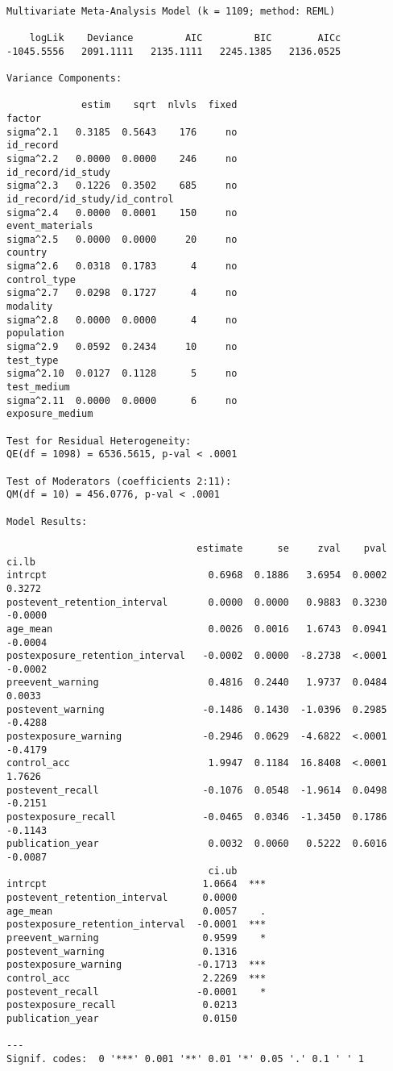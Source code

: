 \documentclass[
  letterpaper,
  DIV=11,
  numbers=noendperiod]{scrartcl}
\begin{document}
\begin{verbatim}

Multivariate Meta-Analysis Model (k = 1109; method: REML)

    logLik    Deviance         AIC         BIC        AICc   
-1045.5556   2091.1111   2135.1111   2245.1385   2136.0525   

Variance Components:

             estim    sqrt  nlvls  fixed                         factor 
sigma^2.1   0.3185  0.5643    176     no                      id_record 
sigma^2.2   0.0000  0.0000    246     no             id_record/id_study 
sigma^2.3   0.1226  0.3502    685     no  id_record/id_study/id_control 
sigma^2.4   0.0000  0.0001    150     no                event_materials 
sigma^2.5   0.0000  0.0000     20     no                        country 
sigma^2.6   0.0318  0.1783      4     no                   control_type 
sigma^2.7   0.0298  0.1727      4     no                       modality 
sigma^2.8   0.0000  0.0000      4     no                     population 
sigma^2.9   0.0592  0.2434     10     no                      test_type 
sigma^2.10  0.0127  0.1128      5     no                    test_medium 
sigma^2.11  0.0000  0.0000      6     no                exposure_medium 

Test for Residual Heterogeneity:
QE(df = 1098) = 6536.5615, p-val < .0001

Test of Moderators (coefficients 2:11):
QM(df = 10) = 456.0776, p-val < .0001

Model Results:

                                 estimate      se     zval    pval    ci.lb 
intrcpt                            0.6968  0.1886   3.6954  0.0002   0.3272 
postevent_retention_interval       0.0000  0.0000   0.9883  0.3230  -0.0000 
age_mean                           0.0026  0.0016   1.6743  0.0941  -0.0004 
postexposure_retention_interval   -0.0002  0.0000  -8.2738  <.0001  -0.0002 
preevent_warning                   0.4816  0.2440   1.9737  0.0484   0.0033 
postevent_warning                 -0.1486  0.1430  -1.0396  0.2985  -0.4288 
postexposure_warning              -0.2946  0.0629  -4.6822  <.0001  -0.4179 
control_acc                        1.9947  0.1184  16.8408  <.0001   1.7626 
postevent_recall                  -0.1076  0.0548  -1.9614  0.0498  -0.2151 
postexposure_recall               -0.0465  0.0346  -1.3450  0.1786  -0.1143 
publication_year                   0.0032  0.0060   0.5222  0.6016  -0.0087 
                                   ci.ub      
intrcpt                           1.0664  *** 
postevent_retention_interval      0.0000      
age_mean                          0.0057    . 
postexposure_retention_interval  -0.0001  *** 
preevent_warning                  0.9599    * 
postevent_warning                 0.1316      
postexposure_warning             -0.1713  *** 
control_acc                       2.2269  *** 
postevent_recall                 -0.0001    * 
postexposure_recall               0.0213      
publication_year                  0.0150      

---
Signif. codes:  0 '***' 0.001 '**' 0.01 '*' 0.05 '.' 0.1 ' ' 1
\end{verbatim}
\end{document}
